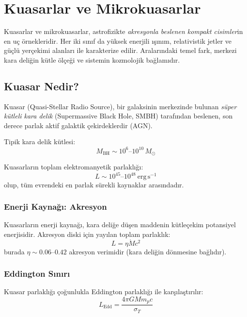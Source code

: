 \section{Kuasarlar ve Mikrokuasarlar}

Kuasarlar ve mikrokuasarlar, astrofizikte \emph{akresyonla beslenen kompakt cisimler}in en uç örnekleridir. Her iki sınıf da yüksek enerjili ışınım, relativistik jetler ve güçlü yerçekimi alanları ile karakterize edilir. Aralarındaki temel fark, merkezi kara deliğin kütle ölçeği ve sistemin kozmolojik bağlamıdır.

\subsection{Kuasar Nedir?}

Kuasar (Quasi-Stellar Radio Source), bir galaksinin merkezinde bulunan \emph{süper kütleli kara delik} (Supermassive Black Hole, SMBH) tarafından beslenen, son derece parlak aktif galaktik çekirdeklerdir (AGN).

Tipik kara delik kütlesi:
\begin{equation}
M_{\mathrm{BH}} \sim 10^6\text{--}10^{10}\,M_\odot
\end{equation}

Kuasarların toplam elektromanyetik parlaklığı:
\begin{equation}
L \sim 10^{45}\text{--}10^{48}\ \mathrm{erg\,s^{-1}}
\end{equation}
olup, tüm evrendeki en parlak sürekli kaynaklar arasındadır.

\subsubsection{Enerji Kaynağı: Akresyon}

Kuasarların enerji kaynağı, kara deliğe düşen maddenin kütleçekim potansiyel enerjisidir. Akresyon diski için yayılan toplam parlaklık:
\begin{equation}
L = \eta \dot{M} c^2
\end{equation}
burada $\eta \sim 0.06$--$0.42$ akresyon verimidir (kara deliğin dönmesine bağlıdır).

\subsubsection{Eddington Sınırı}

Kuasar parlaklığı çoğunlukla Eddington parlaklığı ile karşılaştırılır:
\begin{equation}
L_{\mathrm{Edd}} = \frac{4\pi G M m_p c}{\sigma_T}
\end{equation}

